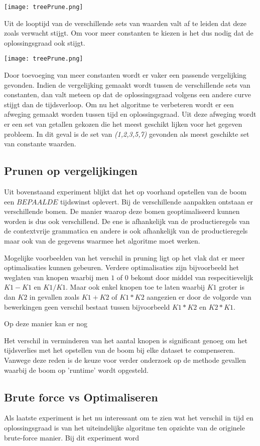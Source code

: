 \documentclass[Main.tex]{subfiles}
\begin{document}
\begin{center}
\texttt{[image: treePrune.png]} 
\end{center}

Uit de looptijd van de verschillende sets van waarden valt af te leiden dat deze zoals verwacht stijgt. Om voor meer constanten te kiezen is het dus nodig dat de oplossingsgraad ook stijgt. 

\begin{center}
\texttt{[image: treePrune.png]} 
\end{center}

Door toevoeging van meer constanten wordt er vaker een passende vergelijking gevonden. Indien de vergelijking gemaakt wordt tussen de verschillende sets van constanten, dan valt meteen op dat de oplossingsgraad volgens een andere curve stijgt dan de tijdsverloop. Om nu het algoritme te verbeteren wordt er een afweging gemaakt worden tussen tijd en oplossingsgraad. Uit deze afweging wordt er een set van getallen gekozen die het meest geschikt lijken voor het gegeven probleem. In dit geval is de set van \textit{(1,2,3,5,7)} gevonden als meest geschikte set van constante waarden. 

\subsection{Prunen op vergelijkingen}

Uit bovenstaand experiment blijkt dat het op voorhand opstellen van de boom een $BEPAALDE$ tijdswinst oplevert. Bij de verschillende aanpakken ontstaan er verschillende bomen. De manier waarop deze bomen geoptimaliseerd kunnen worden is dus ook verschillend. De ene is afhankelijk van de productieregels van de contextvrije grammatica en andere is ook afhankelijk van de productieregels maar ook van de gegevens waarmee het algoritme moet werken. 
\par 
Mogelijke voorbeelden van het verschil in pruning ligt op het vlak dat er meer optimalisaties kunnen gebeuren. Verdere optimalisaties zijn bijvoorbeeld het weglaten van knopen waarbij men $1$ of $0$ bekomt door middel van respecitievelijk $K1-K1$ en $K1/K1$. Maar ook enkel knopen toe te laten waarbij $K1$ groter is dan $K2$ in gevallen zoals $K1+K2$ of $K1*K2$ aangezien er door de volgorde van bewerkingen geen verschil bestaat tussen bijvoorbeeld $K1*K2$ en $K2*K1$.
\par 
Op deze manier kan er nog %

Het verschil in verminderen van het aantal knopen is significant genoeg om het tijdsverlies met het opstellen van de boom bij elke dataset te compenseren. Vanwege deze reden is de keuze voor verder onderzoek op de methode gevallen waarbij de boom op 'runtime' wordt opgesteld. 

\subsection{Brute force vs Optimaliseren}

Als laatste experiment is het nu interessant om te zien wat het verschil in tijd en oplossingsgraad is van het uiteindelijke algoritme ten opzichte van de originele brute-force manier. Bij dit experiment word
\end{document}
